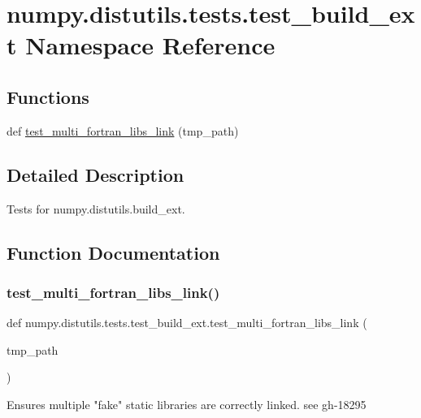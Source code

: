 \hypertarget{namespacenumpy_1_1distutils_1_1tests_1_1test__build__ext}{}\section{numpy.\+distutils.\+tests.\+test\+\_\+build\+\_\+ext Namespace Reference}
\label{namespacenumpy_1_1distutils_1_1tests_1_1test__build__ext}
\subsection*{Functions}
\begin{DoxyCompactItemize}
\item 
def \hyperlink{namespacenumpy_1_1distutils_1_1tests_1_1test__build__ext_a39e3a257962fba721990adb911483810}{test\+\_\+multi\+\_\+fortran\+\_\+libs\+\_\+link} (tmp\+\_\+path)
\end{DoxyCompactItemize}


\subsection{Detailed Description}
\begin{DoxyVerb}Tests for numpy.distutils.build_ext.\end{DoxyVerb}
 

\subsection{Function Documentation}
\mbox{\label{namespacenumpy_1_1distutils_1_1tests_1_1test__build__ext_a39e3a257962fba721990adb911483810}} 
\subsubsection{\texorpdfstring{test\+\_\+multi\+\_\+fortran\+\_\+libs\+\_\+link()}{test\_multi\_fortran\_libs\_link()}}
{\footnotesize\ttfamily def numpy.\+distutils.\+tests.\+test\+\_\+build\+\_\+ext.\+test\+\_\+multi\+\_\+fortran\+\_\+libs\+\_\+link (\begin{DoxyParamCaption}\item[{}]{tmp\+\_\+path }\end{DoxyParamCaption})}

\begin{DoxyVerb}Ensures multiple "fake" static libraries are correctly linked.
see gh-18295
\end{DoxyVerb}
 